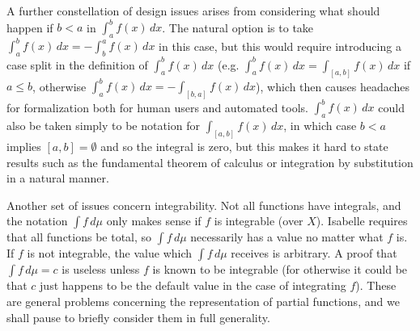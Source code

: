 \documentclass[leqno]{article}
\theoremstyle{definition}
\begin{document}
A further constellation of design issues arises from considering what should happen if $b < a$ in $\int_a^b f(x) \, dx$. The natural option is to take $\int_a^b f(x) \, dx = -\int_b^a f(x) \, dx$ in this case, but this would require introducing a case split in the definition of $\int_a^b f(x) \, dx$ (e.g. $\int_a^b f(x) \, dx = \int_{[a,b]} f(x) \, dx$ if $a \le b$, otherwise $\int_a^b f(x) \, dx = -\int_{[b,a]} f(x) \, dx$), which then causes headaches for formalization both for human users and automated tools. $\int_a^b f(x) \, dx$ could also be taken simply to be notation for $\int_{[a,b]} f(x) \, dx$, in which case $b < a$ implies $[a,b] = \emptyset$ and so the integral is zero, but this makes it hard to state results such as the fundamental theorem of calculus or integration by substitution in a natural manner.

Another set of issues concern integrability. Not all functions have integrals, and the notation $\int f \, d\mu$ only makes sense if $f$ is integrable (over $X$). Isabelle requires that all functions be total, so $\int f \, d\mu$ necessarily has a value no matter what $f$ is. If $f$ is not integrable, the value which $\int f \, d\mu$ receives is arbitrary. A proof that $\int f \, d\mu = c$ is useless unless $f$ is known to be integrable (for otherwise it could be that $c$ just happens to be the default value in the case of integrating $f$). These are general problems concerning the representation of partial functions, and we shall pause to briefly consider them in full generality.
\end{document}
